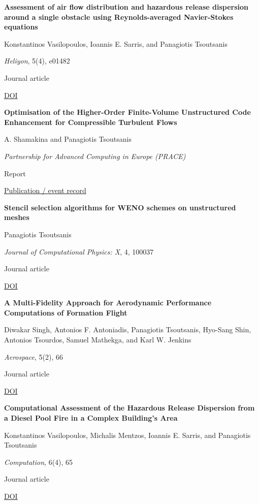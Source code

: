\documentclass[11pt,a4paper]{article}
\newlength{\cventrysep}
\newenvironment{cventry}{%
  \par\noindent\begin{minipage}{\linewidth}
  \RaggedRight\fontsize{9.8}{12.5}\selectfont
}{\end{minipage}\par\addvspace{\cventrysep}}
\newcommand{\cvtitle}[1]{{\bfseries #1\par}\vspace{1pt}}
\newcommand{\cvdetail}[1]{{#1\par}\vspace{1pt}}
\newcommand{\cvmeta}[1]{{\fontsize{9}{11.5}\selectfont\color{Muted}#1\par}\vspace{1pt}}
\newcommand{\cvlinks}[1]{{\fontsize{9}{11.5}\selectfont #1\par}}
\newcommand{\cvyear}[1]{{\color{Teal}\bfseries\fontsize{11}{13}\selectfont #1\par}\vspace{6pt}}
\begin{document}
\begin{cventry}
\cvyear{2019}
\cvtitle{Assessment of air flow distribution and hazardous release dispersion around a single obstacle using Reynolds-averaged Navier-Stokes equations}
\cvdetail{Konstantinos Vasilopoulos, Ioannis E. Sarris, and Panagiotis Tsoutsanis}
\cvmeta{\textit{Heliyon}, 5(4), e01482\par Journal article}
\cvlinks{\href{https://doi.org/10.1016/j.heliyon.2019.e01482}{DOI}}
\end{cventry}

\begin{cventry}
\cvtitle{Optimisation of the Higher-Order Finite-Volume Unstructured Code Enhancement for Compressible Turbulent Flows}
\cvdetail{A. Shamakina and Panagiotis Tsoutsanis}
\cvmeta{\textit{Partnership for Advanced Computing in Europe (PRACE)}\par Report}
\cvlinks{\href{https://prace-ri.eu/wp-content/uploads/WP288.pdf}{Publication / event record}}
\end{cventry}

\begin{cventry}
\cvtitle{Stencil selection algorithms for WENO schemes on unstructured meshes}
\cvdetail{Panagiotis Tsoutsanis}
\cvmeta{\textit{Journal of Computational Physics: X}, 4, 100037\par Journal article}
\cvlinks{\href{https://doi.org/10.1016/j.jcpx.2019.100037}{DOI}}
\end{cventry}

\begin{cventry}
\cvyear{2018}
\cvtitle{A Multi-Fidelity Approach for Aerodynamic Performance Computations of Formation Flight}
\cvdetail{Diwakar Singh, Antonios F. Antoniadis, Panagiotis Tsoutsanis, Hyo-Sang Shin, Antonios Tsourdos, Samuel Mathekga, and Karl W. Jenkins}
\cvmeta{\textit{Aerospace}, 5(2), 66\par Journal article}
\cvlinks{\href{https://doi.org/10.3390/aerospace5020066}{DOI}}
\end{cventry}

\begin{cventry}
\cvtitle{Computational Assessment of the Hazardous Release Dispersion from a Diesel Pool Fire in a Complex Building's Area}
\cvdetail{Konstantinos Vasilopoulos, Michalis Mentzos, Ioannis E. Sarris, and Panagiotis Tsoutsanis}
\cvmeta{\textit{Computation}, 6(4), 65\par Journal article}
\cvlinks{\href{https://doi.org/10.3390/computation6040065}{DOI}}
\end{cventry}
\end{document}
